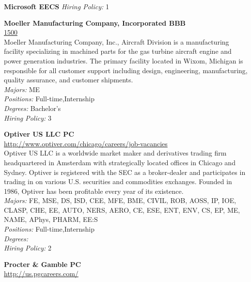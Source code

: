 \documentclass[twoside]{article}
\begin{document}
\begin{center}
\begin{multicols}{2}
\begin{minipage}{.95\columnwidth}{\Large\bf Microsoft \hfill EECS}
    \emph{Hiring Policy:} 1\\
\end{minipage}
 \begin{minipage}{.95\columnwidth}{\Large\bf Moeller Manufacturing Company, Incorporated \hfill BBB}\\
    \url{1500}\\
    Moeller Manufacturing Company, Inc., Aircraft Division is a manufacturing facility specializing in machined parts for the gas turbine aircraft engine and power generation industries. The primary facility located in Wixom, Michigan is responsible for all customer support including design, engineering, manufacturing, quality assurance, and customer shipments.\\
    \emph{Majors:} ME\\
    \emph{Positions:} Full-time,Internship\\
    \emph{Degrees:} Bachelor's\\
    \emph{Hiring Policy:} 3\\
\end{minipage}
 \begin{minipage}{.95\columnwidth}{\Large\bf Optiver US LLC \hfill PC}\\
    \url{http://www.optiver.com/chicago/careers/job-vacancies}\\
    Optiver US LLC is a worldwide market maker and derivatives trading firm headquartered in Amsterdam with strategically located offices in Chicago and Sydney. Optiver is registered with the SEC as a broker-dealer and participates in trading in on various U.S. securities and commodities exchanges. Founded in 1986, Optiver has been profitable every year of its existence.\\
    \emph{Majors:} FE, MSE, DS, ISD, CEE, MFE, BME, CIVIL, ROB, AOSS, IP, IOE, CLASP, CHE, EE, AUTO, NERS, AERO, CE, ESE, ENT, ENV, CS, EP, ME, NAME, APhys, PHARM, EE:S\\
    \emph{Positions:} Full-time,Internship\\
    \emph{Degrees:} \\
    \emph{Hiring Policy:} 2\\
\end{minipage}
 \begin{minipage}{.95\columnwidth}{\Large\bf Procter \& Gamble \hfill PC}\\
    \url{http://us.pgcareers.com/}\\

\end{minipage}
\end{multicols}
\end{center}
\end{document}
